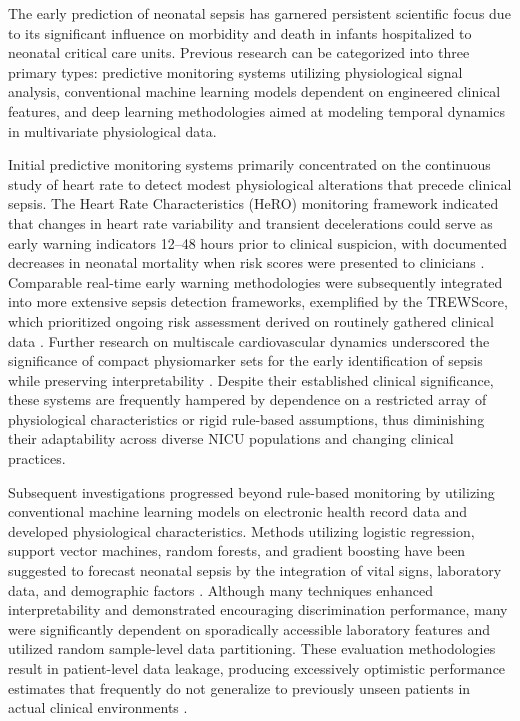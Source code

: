 \documentclass[conference]{IEEEtran}
\begin{document}
The early prediction of neonatal sepsis has garnered persistent scientific focus due to its significant influence on morbidity and death in infants hospitalized to neonatal critical care units. Previous research can be categorized into three primary types: predictive monitoring systems utilizing physiological signal analysis, conventional machine learning models dependent on engineered clinical features, and deep learning methodologies aimed at modeling temporal dynamics in multivariate physiological data.

Initial predictive monitoring systems primarily concentrated on the continuous study of heart rate to detect modest physiological alterations that precede clinical sepsis. The Heart Rate Characteristics (HeRO) monitoring framework indicated that changes in heart rate variability and transient decelerations could serve as early warning indicators 12–48 hours prior to clinical suspicion, with documented decreases in neonatal mortality when risk scores were presented to clinicians \cite{hero_monitoring}. Comparable real-time early warning methodologies were subsequently integrated into more extensive sepsis detection frameworks, exemplified by the TREWScore, which prioritized ongoing risk assessment derived on routinely gathered clinical data \cite{Henry2015TREW}. Further research on multiscale cardiovascular dynamics underscored the significance of compact physiomarker sets for the early identification of sepsis while preserving interpretability \cite{Shashikumar2017EarlySepsis,VanWyk2019Physiomarkers}. Despite their established clinical significance, these systems are frequently hampered by dependence on a restricted array of physiological characteristics or rigid rule-based assumptions, thus diminishing their adaptability across diverse NICU populations and changing clinical practices.

Subsequent investigations progressed beyond rule-based monitoring by utilizing conventional machine learning models on electronic health record data and developed physiological characteristics. Methods utilizing logistic regression, support vector machines, random forests, and gradient boosting have been suggested to forecast neonatal sepsis by the integration of vital signs, laboratory data, and demographic factors \cite{plos_ehr_sepsis,mbarara_ehr_sepsis}. Although many techniques enhanced interpretability and demonstrated encouraging discrimination performance, many were significantly dependent on sporadically accessible laboratory features and utilized random sample-level data partitioning. These evaluation methodologies result in patient-level data leakage, producing excessively optimistic performance estimates that frequently do not generalize to previously unseen patients in actual clinical environments \cite{Nemati2018Interpretable,Saria2019SafeML,Futoma2017Critique}.
\end{document}
